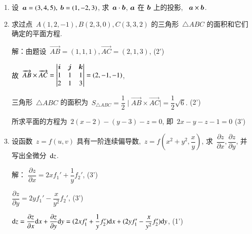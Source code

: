 \documentclass[twocolumn,landscape,fntef,UTF8]{ctexart}
\begin{document}
\begin{enumerate}%
\item 设~$\boldsymbol{a}=(3,4,5),~\boldsymbol{b}=(1,-2,3)$, 求~$\boldsymbol{a}\cdot\boldsymbol{b}$, $\boldsymbol{a}$ 在 $ \boldsymbol{b}$ 上的投影, ~$\boldsymbol{a}\times\boldsymbol{b}$.

	
\item  求过点~$A(1,2,-1), B(2,3,0),C(3,3,2)$ 的三角形~$\triangle ABC$ 的面积和它们确定的平面方程.

解：由题设~$\overrightarrow{AB}=(1,1,1),\overrightarrow{AC}=(2,1,3)$, \dotfill{}(2')

故~$\overrightarrow{AB}\times \overrightarrow{AC}=\begin{vmatrix}
\boldsymbol{i}&\boldsymbol{j} &\boldsymbol{k}\\
1&1&1\\
2&1&3\\
\end{vmatrix}=(2,-1,-1)$,

三角形~$\triangle ABC$ 的面积为~$S_{\triangle ABC}=\dfrac{1}{2}\mid\overrightarrow{AB}\times \overrightarrow{AC}\mid=\dfrac{1}{2}\sqrt{6}.$  \dotfill{}(2')

所求平面的方程为~$2(x-2)-(y-3)-z=0$, 即~$2x-y-z-1=0$
 \dotfill{}(3')			

\item 设函数~$z = f(u,v)$ 具有一阶连续偏导数,~$z = f(x^2+y^2,\dfrac{x}{y})$, 求~$\dfrac{\partial z}{\partial x}, \dfrac{\partial z}{\partial y}$, 并写出全微分~$\mathrm{d} z$.
			
解： $\dfrac{\partial z}{\partial x} = 2xf_1' + \dfrac{1}{y}f_2'$, \dotfill{}(3')
			
$\dfrac{\partial z}{\partial y} = 2y f_1' - \dfrac{x}{y^2}f_2'$, \dotfill{}(3')
			
$\mathrm{d} z =\dfrac{\partial z}{\partial x}\mathrm{d} x + \dfrac{\partial z}{\partial y} \mathrm{d} y\\	=(2xf_1' + \dfrac{1}{y}f_2')\mathrm{d} x +(2y f_1' - \dfrac{x}{y^2}f_2')\mathrm{d} y$, \dotfill{}(1')
\end{enumerate}
\vspace{2cm}
\end{document}
